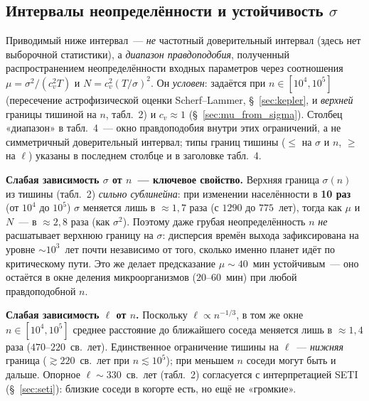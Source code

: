 \documentclass[12pt,a4paper]{article}
\begin{document}
\subsection{Интервалы неопределённости и устойчивость $\sigma$}
\label{sec:intervals}

Приводимый ниже интервал~--- \emph{не} частотный доверительный интервал (здесь нет выборочной статистики), а \emph{диапазон правдоподобия}, полученный распространением неопределённости входных параметров через соотношения $\mu=\sigma^2/(c_v^2T)$ и $N=c_v^2(T/\sigma)^2$. Он \emph{условен}: задаётся при $n\in[10^4,10^5]$ (пересечение астрофизической оценки Scherf--Lammer, \S~\ref{sec:kepler}, и \emph{верхней} границы тишиной на $n$, табл.~2) и $c_v\approx1$ (\S~\ref{sec:mu_from_sigma}). Столбец «диапазон» в табл.~4~--- окно правдоподобия внутри этих ограничений, а не симметричный доверительный интервал; типы границ тишины ($\le$ на $\sigma$ и $n$, $\ge$ на $\ell$) указаны в последнем столбце и в заголовке табл.~4.

\textbf{Слабая зависимость $\sigma$ от $n$~--- ключевое свойство.} Верхняя граница $\sigma(n)$ из тишины (табл.~2) \emph{сильно сублинейна}: при изменении населённости в \textbf{10 раз} (от $10^4$ до $10^5$) $\sigma$ меняется лишь в $\approx1{,}7$ раза (с $1290$ до $775$~лет), тогда как $\mu$ и $N$~--- в $\approx2{,}8$ раза (как $\sigma^2$). Поэтому даже грубая неопределённость $n$ \emph{не} расшатывает верхнюю границу на $\sigma$: дисперсия времён выхода зафиксирована на уровне $\sim10^3$~лет почти независимо от того, сколько именно планет идёт по критическому пути. Это же делает предсказание $\mu\sim40$~мин устойчивым~--- оно остаётся в окне деления микроорганизмов ($20$--$60$~мин) при любой правдоподобной $n$.

\textbf{Слабая зависимость $\ell$ от $n$.} Поскольку $\ell \propto n^{-1/3}$, в том же окне $n\in[10^4,10^5]$ среднее расстояние до ближайшего соседа меняется лишь в $\approx1{,}4$ раза ($470$--$220$~св.~лет). Единственное ограничение тишины на $\ell$~--- \emph{нижняя} граница ($\gtrsim 220$~св.~лет при $n\lesssim 10^5$); при меньшем $n$ соседи могут быть и дальше. Опорное $\ell\sim330$~св.~лет (табл.~2) согласуется с интерпретацией SETI (\S~\ref{sec:seti}): близкие соседи в когорте есть, но ещё не «громкие».
\end{document}

